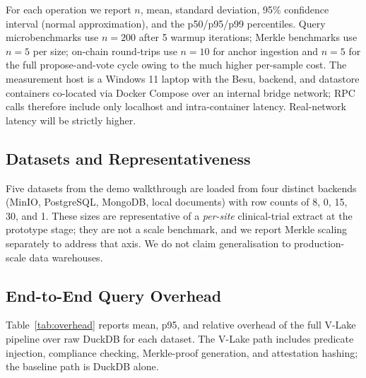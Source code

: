\documentclass[10pt,twocolumn]{article}
\begin{document}
For each operation we report $n$, mean, standard deviation, 95\%
confidence interval (normal approximation), and the p50/p95/p99
percentiles. Query microbenchmarks use $n=200$ after 5 warmup
iterations; Merkle benchmarks use $n{=}5$ per size; on-chain
round-trips use $n{=}10$ for anchor ingestion and $n{=}5$ for the
full propose-and-vote cycle owing to the much higher per-sample
cost. The measurement host is a Windows 11 laptop with the Besu,
backend, and datastore containers co-located via Docker Compose
over an internal bridge network; RPC calls therefore include only
localhost and intra-container latency. Real-network latency will
be strictly higher.

\subsection{Datasets and Representativeness}

Five datasets from the demo walkthrough are loaded from four
distinct backends (MinIO, PostgreSQL, MongoDB, local documents)
with row counts of 8, 0, 15, 30, and 1. These sizes are
representative of a \emph{per-site} clinical-trial extract at the
prototype stage; they are not a scale benchmark, and we report
Merkle scaling separately to address that axis. We do not claim
generalisation to production-scale data warehouses.

\subsection{End-to-End Query Overhead}

Table~\ref{tab:overhead} reports mean, p95, and relative overhead
of the full V-Lake pipeline over raw DuckDB for each dataset. The
V-Lake path includes predicate injection, compliance checking,
Merkle-proof generation, and attestation hashing; the baseline
path is DuckDB alone.
\end{document}
